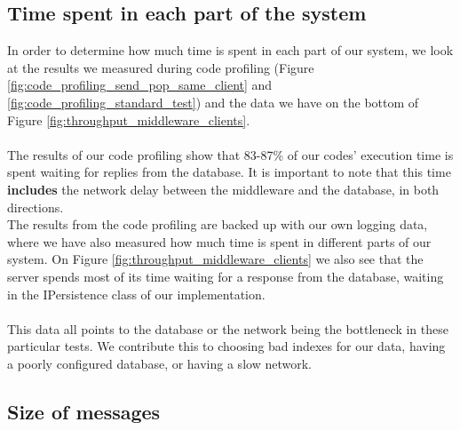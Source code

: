 \documentclass{article}
\begin{document}
        \subsection{Time spent in each part of the system}
            In order to determine how much time is spent in each part of our system, we look at the results we measured during code profiling (Figure \ref{fig:code_profiling_send_pop_same_client} and \ref{fig:code_profiling_standard_test}) and the data we have on the bottom of Figure \ref{fig:throughput_middleware_clients}.\\
            \\
            The results of our code profiling show that 83-87\% of our codes' execution time is spent waiting for replies from the database. It is important to note that this time \textbf{includes} the network delay between the middleware and the database, in both directions.\\
            The results from the code profiling are backed up with our own logging data, where we have also measured how much time is spent in different parts of our system. On Figure \ref{fig:throughput_middleware_clients} we also see that the server spends most of its time waiting for a response from the database, waiting in the IPersistence class of our implementation.\\
            \\
            This data all points to the database or the network being the bottleneck in these particular tests. We contribute this to choosing bad indexes for our data, having a poorly configured database, or having a slow network.


        \subsection{Size of messages}
\end{document}
